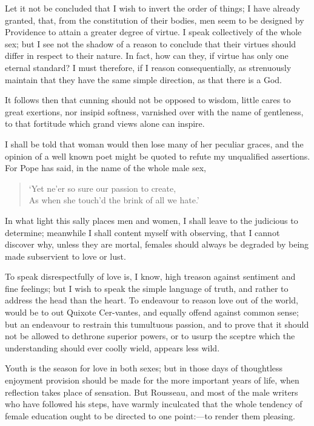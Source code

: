 Let it not be concluded that I wish to invert the order of things; I
have already granted, that, from the constitution of their bodies, men
seem to be designed by Providence to attain a greater degree of
virtue. I speak collectively of the whole sex; but I see not the
shadow of a reason to conclude that their virtues should differ in
respect to their nature. In fact, how can they, if virtue has only one
eternal standard? I must therefore, if I reason consequentially, as
strenuously maintain that they have the same simple direction, as that
there is a God.

It follows then that cunning should not be opposed to wisdom,
little cares to great exertions, nor insipid softness, varnished over
with the name of gentleness, to that fortitude which grand views alone
can inspire.

I shall be told that woman would then lose many of her peculiar
graces, and the opinion of a well known poet might be quoted to refute
my unqualified assertions. For Pope has said, in the name of the whole
male sex,

\begin{verse}
`Yet ne'er so sure our passion to create,\\
As when she touch'd the brink of all we hate.'
\end{verse}

In what light this sally places men and women, I shall leave to the
judicious to determine; meanwhile I shall content myself with
observing, that I cannot discover why, unless they are mortal, females
should always be degraded by being made subservient to love or lust.

To speak disrespectfully of love is, I know, high treason against
sentiment and fine feelings; but I wish to speak the simple language
of truth, and rather to address the head than the heart. To endeavour
to reason love out of the world, would be to out Quixote
Cer-vantes, and equally offend against common sense; but an
endeavour to restrain this tumultuous passion, and to prove that it
should not be allowed to dethrone superior powers, or to usurp the
sceptre which the understanding should ever coolly wield, appears less
wild.

Youth is the season for love in both sexes; but in those days of
thoughtless enjoyment provision should be made for the more important
years of life, when reflection takes place of sensation. But Rousseau,
and most of the male writers who have followed his steps, have warmly
inculcated that the whole tendency of female education ought to be
directed to one point:---to render them pleasing.

